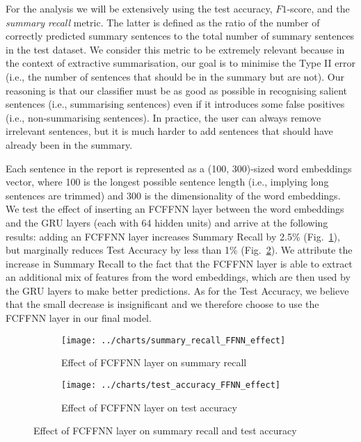 For the analysis we will be extensively using the test accuracy, $F1$-score, and the \emph{summary recall} metric.
The latter is defined as the ratio of the number of correctly predicted summary sentences to the total number of summary sentences in the test dataset.
We consider this metric to be extremely relevant because in the context of extractive summarisation, our goal is to minimise the Type II error (i.e., the number of sentences that should be in the summary but are not).
Our reasoning is that our classifier must be as good as possible in recognising salient sentences (i.e., summarising sentences) even if it introduces some false positives (i.e., non-summarising sentences).
In practice, the user can always remove irrelevant sentences, but it is much harder to add sentences that should have already been in the summary.

Each sentence in the report is represented as a (100, 300)-sized word embeddings vector, where 100 is the longest possible sentence length (i.e., implying long sentences are trimmed) and 300 is the dimensionality of the word embeddings.
We test the effect of inserting an FCFFNN layer between the word embeddings and the GRU layers (each with 64 hidden units) and arrive at the following results:
adding an FCFFNN layer increases Summary Recall by 2.5\% (Fig.~\ref{fig:summary_recall_FFNN_effect}), but marginally reduces Test Accuracy by less than 1\% (Fig.~\ref{fig:test_accuracy_FFNN_effect}).
We attribute the increase in Summary Recall to the fact that the FCFFNN layer is able to extract an additional mix of features from the word embeddings, which are then used by the GRU layers to make better predictions.
As for the Test Accuracy, we believe that the small decrease is insignificant and we therefore choose to use the FCFFNN layer in our final model.

\begin{figure}[ht]
    \begin{subfigure}{0.49\textwidth}
        \centering \texttt{[image: ../charts/summary\_recall\_FFNN\_effect]}
        \caption{Effect of FCFFNN layer on summary recall}
        \label{fig:summary_recall_FFNN_effect}
    \end{subfigure}%
    \hfill
    \begin{subfigure}{0.49\textwidth}
        \centering
        \texttt{[image: ../charts/test\_accuracy\_FFNN\_effect]}
        \caption{Effect of FCFFNN layer on test accuracy}
        \label{fig:test_accuracy_FFNN_effect}
    \end{subfigure}
    \caption{Effect of FCFFNN layer on summary recall and test accuracy}
    \label{fig:FCFFNN}
\end{figure}

